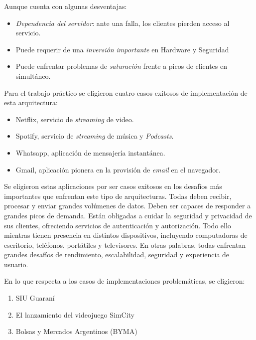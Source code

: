 \documentclass[11pt]{article}
\begin{document}
Aunque cuenta con algunas desventajas:
\begin{itemize}
    \item \emph{Dependencia del servidor}:
    ante una falla, los clientes pierden acceso al servicio.
    
    \item Puede requerir de una \emph{inversión importante} en Hardware y
    Seguridad 
    
    \item Puede enfrentar problemas de \emph{saturación} frente a picos de 
    clientes en simultáneo.
\end{itemize}

Para el trabajo práctico se eligieron cuatro casos exitosos de implementación de 
esta arquitectura:
\begin{itemize}
    \item Netflix, servicio de \emph{streaming} de video.
    
    \item Spotify, servicio de \emph{streaming} de música y \emph{Podcasts}.

    \item Whatsapp, aplicación de mensajería instantánea.
    
    \item Gmail, aplicación pionera en la provisión de \emph{email} en el
    navegador.
\end{itemize}

Se eligieron estas aplicaciones por ser casos exitosos en los desafíos más 
importantes que enfrentan este tipo de arquitecturas.
Todas deben recibir, procesar y enviar grandes volúmenes de datos.
Deben ser capaces de responder a grandes picos de demanda.
Están obligadas a cuidar la seguridad y privacidad de sus clientes,
ofreciendo servicios de autenticación y autorización.
Todo ello mientras tienen presencia en distintos dispositivos,
incluyendo computadoras de escritorio, teléfonos, portátiles y televisores.
En otras palabras, todas enfrentan grandes desafíos de rendimiento,
escalabilidad, seguridad y experiencia de usuario.

En lo que respecta a los casos de implementaciones problemáticas, se eligieron:
\begin{enumerate}
    \item SIU Guaraní
    \item El lanzamiento del videojuego SimCity
    \item Bolsas y Mercados Argentinos (BYMA)
\end{enumerate}
\end{document}

